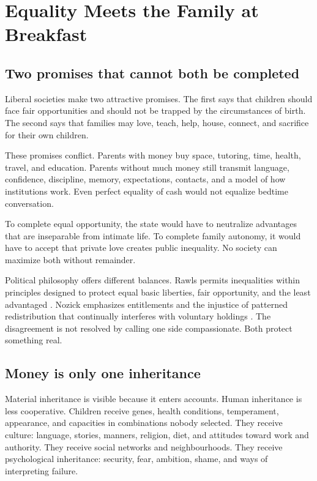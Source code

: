 \documentclass[12pt,a4paper]{book}
\begin{document}
\chapter{Equality Meets the Family at Breakfast}
\label{chap:equality-family-breakfast}

\section{Two promises that cannot both be completed}

Liberal societies make two attractive promises.  The first says that children
should face fair opportunities and should not be trapped by the circumstances
of birth.  The second says that families may love, teach, help, house, connect,
and sacrifice for their own children.

These promises conflict.  Parents with money buy space, tutoring, time,
health, travel, and education.  Parents without much money still transmit
language, confidence, discipline, memory, expectations, contacts, and a model
of how institutions work.  Even perfect equality of cash would not equalize
bedtime conversation.

To complete equal opportunity, the state would have to neutralize advantages
that are inseparable from intimate life.  To complete family autonomy, it
would have to accept that private love creates public inequality.  No society
can maximize both without remainder.

Political philosophy offers different balances.  Rawls permits inequalities
within principles designed to protect equal basic liberties, fair opportunity,
and the least advantaged \cite{Rawls1999}.  Nozick emphasizes entitlements and
the injustice of patterned redistribution that continually interferes with
voluntary holdings \cite{Nozick1974}.  The disagreement is not resolved by
calling one side compassionate.  Both protect something real.

\section{Money is only one inheritance}

Material inheritance is visible because it enters accounts.  Human inheritance
is less cooperative.  Children receive genes, health conditions, temperament,
appearance, and capacities in combinations nobody selected.  They receive
culture: language, stories, manners, religion, diet, and attitudes toward work
and authority.  They receive social networks and neighbourhoods.  They receive
psychological inheritance: security, fear, ambition, shame, and ways of
interpreting failure.
\end{document}

